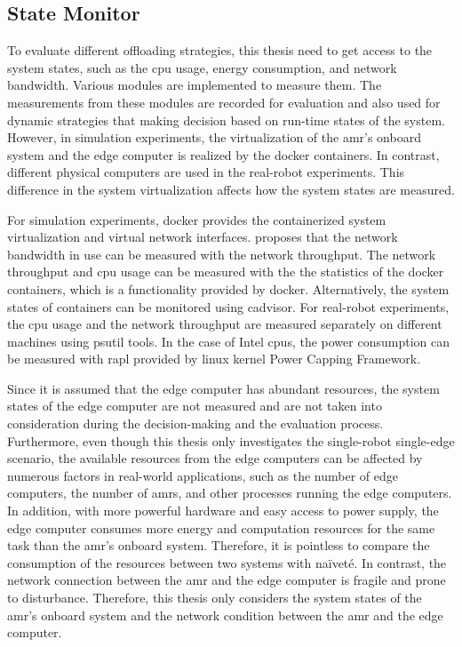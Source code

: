 \subsection{State Monitor}

To evaluate different offloading strategies, this thesis need to get access to the system states, such as the \gls{cpu} usage, energy consumption, and network bandwidth. Various modules are implemented to measure them. 
The measurements from these modules are recorded for evaluation and also used for dynamic strategies that making decision based on run-time states of the system. However, in simulation experiments, the virtualization of the \gls{amr}'s onboard system and the edge computer is realized by the \gls{docker} containers. In contrast, different physical computers are used in the real-robot experiments. This difference in the system virtualization affects how the system states are measured. 

For simulation experiments, \gls{docker} provides the containerized system virtualization and virtual network interfaces. \citeauthor*{Ruggeri2022} \cite{Ruggeri2022} proposes that the network bandwidth in use can be measured with the network throughput. The network throughput and \gls{cpu} usage can be measured with the the statistics of the \gls{docker} containers, which is a functionality provided by \gls{docker}. Alternatively, the system states of containers can be monitored using \gls{cadvisor}. For real-robot experiments, the \gls{cpu} usage and the network throughput are measured separately on different machines using \gls{psutil} tools. In the case of Intel \glspl{cpu}, the power consumption can be measured with \gls{rapl} provided by \gls{linux} kernel Power Capping Framework. 

Since it is assumed that the edge computer has abundant resources, the system states of the edge computer are not measured and are not taken into consideration during the decision-making and the evaluation process. Furthermore, even though this thesis only investigates the single-robot single-edge scenario, the available resources from the edge computers can be affected by numerous factors in real-world applications, such as the number of edge computers, the number of \glspl{amr}, and other processes running the edge computers. In addition, with more powerful hardware and easy access to power supply, the edge computer consumes more energy and computation resources for the same task than the \gls{amr}'s onboard system. Therefore, it is pointless to compare the consumption of the resources between two systems with na\"{i}vet\'{e}. In contrast, the network connection between the \gls{amr} and the edge computer is fragile and prone to disturbance. Therefore, this thesis only considers the system states of the \gls{amr}'s onboard system and the network condition between the \gls{amr} and the edge computer. 


